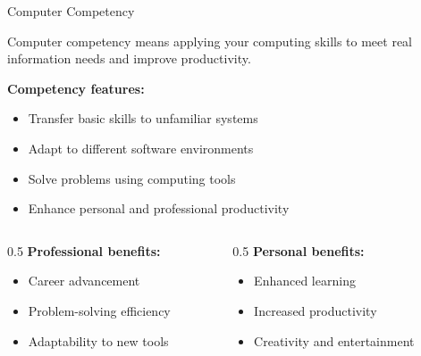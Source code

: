 \documentclass[aspectratio=169]{beamer}
\begin{document}
\begin{frame}{Computer Competency}
  \begin{definition}
    Computer competency means applying your computing skills to meet real
    information needs and improve productivity.
  \end{definition}
  \vspace{0.3cm}
  \textbf{Competency features:}
  \begin{itemize}
    \item Transfer basic skills to unfamiliar systems
    \item Adapt to different software environments
    \item Solve problems using computing tools
    \item Enhance personal and professional productivity
  \end{itemize}
  \vspace{0.4cm}
  \begin{columns}[T]
    \begin{column}{0.5\textwidth}
      \textbf{Professional benefits:}
      \begin{itemize}
        \item Career advancement
        \item Problem-solving efficiency
        \item Adaptability to new tools
      \end{itemize}
    \end{column}
    \begin{column}{0.5\textwidth}
      \textbf{Personal benefits:}
      \begin{itemize}
        \item Enhanced learning
        \item Increased productivity
        \item Creativity and entertainment
      \end{itemize}
    \end{column}
  \end{columns}
\end{frame}
\end{document}
